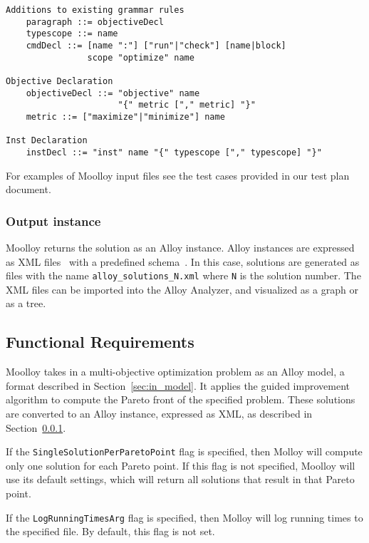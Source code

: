 \documentclass[11pt]{article}
\theoremstyle{definition}
\begin{document}
\begin{verbatim}
Additions to existing grammar rules
    paragraph ::= objectiveDecl
    typescope ::= name
    cmdDecl ::= [name ":"] ["run"|"check"] [name|block]
                scope "optimize" name

Objective Declaration
    objectiveDecl ::= "objective" name
                      "{" metric ["," metric] "}"
    metric ::= ["maximize"|"minimize"] name

Inst Declaration
    instDecl ::= "inst" name "{" typescope ["," typescope] "}"
\end{verbatim}

For examples of Moolloy input files see the test cases provided in
our test plan document.

\subsubsection{Output instance}\label{sec:out_model}

Moolloy returns the solution as an Alloy instance. Alloy instances are
expressed as XML files~\cite{ref:alloy_xml} with a predefined
schema~\cite{ref:alloy_xsd}. In this case, solutions are generated as
files with the name \texttt{alloy\_solutions\_N.xml} where \texttt{N}
is the solution number. The XML files can be imported into the Alloy
Analyzer, and visualized as a graph or as a tree.

\subsection{Functional Requirements}\label{sec:func_req}

Moolloy takes in a multi-objective optimization problem as an Alloy
model, a format described in Section~\ref{sec:in_model}. It applies the
guided improvement algorithm to compute the Pareto front of the
specified problem. These solutions are converted to an Alloy instance,
expressed as XML, as described in Section~\ref{sec:out_model}.

If the \texttt{SingleSolutionPerParetoPoint} flag is specified, then
Molloy will compute only one solution for each Pareto point. If this
flag is not specified, Moolloy will use its default settings, which
will return all solutions that result in that Pareto point.

If the \texttt{LogRunningTimesArg} flag is specified, then Molloy will
log running times to the specified file. By default, this flag is not
set.
\end{document}
